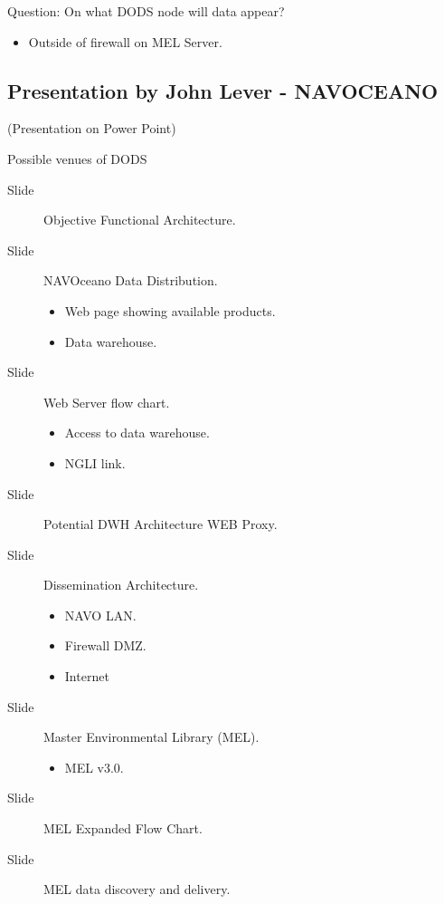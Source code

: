 Question: On what DODS node will data appear?

\begin{itemize}
\item Outside of firewall on MEL Server.
\end{itemize}

\subsection{Presentation by John Lever - NAVOCEANO}

(Presentation on Power Point)

Possible venues of DODS

\begin{description}
\item[Slide] Objective Functional Architecture.

\item[Slide] NAVOceano Data Distribution.
\begin{itemize}
\item Web page showing available products.
\item Data warehouse.
\end{itemize}

\item[Slide] Web Server flow chart.
\begin{itemize}
\item Access to data warehouse.
\item NGLI link.
\end{itemize}

\item[Slide] Potential DWH Architecture WEB Proxy.

\item[Slide] Dissemination Architecture.
\begin{itemize}
\item NAVO LAN.
\item Firewall DMZ.
\item Internet
\end{itemize}

\item[Slide] Master Environmental Library  (MEL).
\begin{itemize}
\item MEL v3.0.
\end{itemize}


\item[Slide] MEL Expanded Flow Chart.

\item[Slide] MEL data discovery and delivery.


\end{description}
